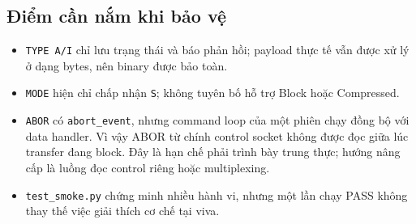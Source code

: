 \subsection{Điểm cần nắm khi bảo vệ}
\begin{itemize}
\item \texttt{TYPE A/I} chỉ lưu trạng thái và báo phản hồi; payload thực tế vẫn được xử lý ở dạng bytes, nên binary được bảo toàn.
\item \texttt{MODE} hiện chỉ chấp nhận \texttt{S}; không tuyên bố hỗ trợ Block hoặc Compressed.
\item \texttt{ABOR} có \texttt{abort\_event}, nhưng command loop của một phiên chạy đồng bộ với data handler. 
Vì vậy ABOR từ chính control socket không được đọc giữa lúc transfer đang block. 
Đây là hạn chế phải trình bày trung thực; hướng nâng cấp là luồng đọc control riêng hoặc multiplexing.
\item \texttt{test\_smoke.py} chứng minh nhiều hành vi, nhưng một lần chạy PASS không thay thế việc giải thích cơ chế tại viva.
\end{itemize}